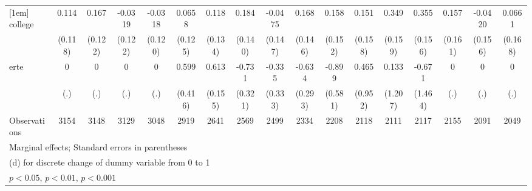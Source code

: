 {\begin{tabular}{l*{16}{c}}
[1em]
college             &       0.114         &       0.167         &     -0.0319         &     -0.0318         &      0.0658         &       0.118         &       0.184         &     -0.0475         &       0.168         &       0.158         &       0.151         &       0.349\sym{*}  &       0.355\sym{*}  &       0.157         &     -0.0420         &      0.0661         \\
                    &     (0.118)         &     (0.122)         &     (0.122)         &     (0.120)         &     (0.125)         &     (0.134)         &     (0.140)         &     (0.147)         &     (0.146)         &     (0.152)         &     (0.158)         &     (0.159)         &     (0.156)         &     (0.161)         &     (0.156)         &     (0.168)         \\
[1em]
erte                &           0         &           0         &           0         &           0         &       0.599         &       0.613\sym{***}&      -0.731\sym{*}  &      -0.335         &      -0.634\sym{*}  &      -0.899         &       0.465         &       0.133         &      -0.671         &           0         &           0         &           0         \\
                    &         (.)         &         (.)         &         (.)         &         (.)         &     (0.416)         &     (0.155)         &     (0.321)         &     (0.333)         &     (0.293)         &     (0.581)         &     (0.952)         &     (1.207)         &     (1.464)         &         (.)         &         (.)         &         (.)         \\
\hline
Observations        &        3154         &        3148         &        3129         &        3048         &        2919         &        2641         &        2569         &        2499         &        2334         &        2208         &        2118         &        2111         &        2117         &        2155         &        2091         &        2049         \\
\hline\hline
\multicolumn{17}{l}{\footnotesize Marginal effects; Standard errors in parentheses}\\
\multicolumn{17}{l}{\footnotesize  (d) for discrete change of dummy variable from 0 to 1}\\
\multicolumn{17}{l}{\footnotesize \sym{*} \(p<0.05\), \sym{**} \(p<0.01\), \sym{***} \(p<0.001\)}\\
\end{tabular}
}
